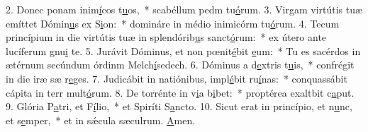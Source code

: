 2. Donec ponam inim\uline{í}cos t\uline{u}os,~* scabéllum pedm tu\uline{ó}rum.
3. Virgam virtútis tuæ emíttet Dómin\uline{u}s ex S\uline{i}on:~* domináre in médio inimicórm tu\uline{ó}rum.
4. Tecum princípium in die virtútis tuæ in splendórib\uline{u}s sanct\uline{ó}rum:~* ex útero ante lucíferum gnu\uline{i} te.
5. Jurávit Dóminus, et non pœnit\uline{é}bit \uline{e}um:~* Tu es sacérdos in ætérnum secúndum órdinm Melch\uline{í}sedech.
6. Dóminus a d\uline{e}xtris t\uline{u}is,~* confrégit in die iræ sæ r\uline{e}ges.
7. Judicábit in natiónibus, impl\uline{é}bit ru\uline{í}nas:~* conquassábit cápita in terr mult\uline{ó}rum.
8. De torrénte in v\uline{i}a b\uline{i}bet:~* proptérea exaltbit c\uline{a}put.
9. Glória P\uline{a}tri, et F\uline{í}lio,~* et Spiríti S\uline{a}ncto.
10. Sicut erat in princípio, et n\uline{u}nc, et s\uline{e}mper,~* et in sǽcula sæculrum. \uline{A}men.
